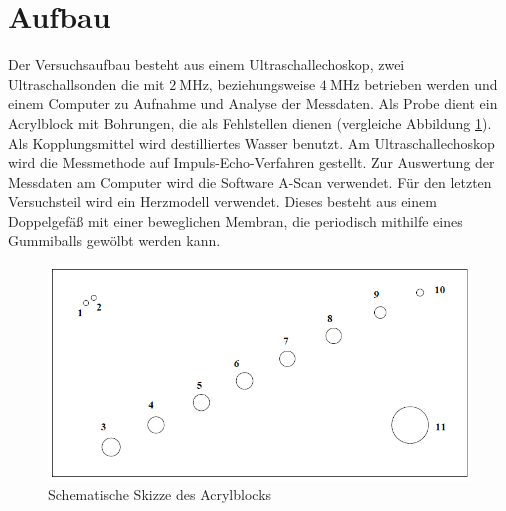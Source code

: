\section{Aufbau}
\label{sec:Aufbau}

Der Versuchsaufbau besteht aus einem Ultraschallechoskop, zwei Ultraschallsonden die mit $\SI{2}{\mega\hertz}$, beziehungsweise $\SI{4}{\mega\hertz}$ betrieben werden und einem Computer zu Aufnahme und Analyse der Messdaten. Als Probe dient ein Acrylblock mit Bohrungen, die als Fehlstellen dienen (vergleiche Abbildung \ref{fig:Probe}). Als Kopplungsmittel wird destilliertes Wasser benutzt. Am Ultraschallechoskop wird die Messmethode auf Impuls-Echo-Verfahren gestellt. Zur Auswertung der Messdaten am Computer wird die Software A-Scan verwendet. Für den letzten Versuchsteil wird ein Herzmodell verwendet. Dieses besteht aus einem Doppelgefäß mit einer beweglichen Membran, die periodisch mithilfe eines Gummiballs gewölbt werden kann. 
\begin{figure}
\centering
\includegraphics[scale=0.4]{content/images/Acrylblock.jpg}
\caption{Schematische Skizze des Acrylblocks \cite{US2}}
\label{fig:Probe}
\end{figure}